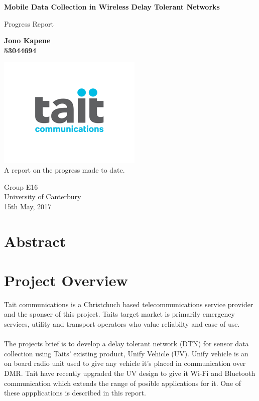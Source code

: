 \documentclass[a4paper,12pt]{article}
\begin{document}
	\begin{titlepage}
    		\begin{center}
        		\vspace*{1cm}
        
        		\textbf{Mobile Data Collection in Wireless Delay Tolerant Networks}
        
        		\vspace{0.5cm}
        		Progress Report
        
        		\vspace{1.5cm}
        
        		\textbf{Jono Kapene \\ 53044694}
        
        		\vfill
        		\includegraphics[scale=0.8]{Tait-Communications-logo.png}\\
        		A report on the progress made to date.
        		
        		\vspace{0.8cm}
        
        		Group E16\\
        		University of Canterbury\\
        		15th May, 2017
        
    \end{center}
\end{titlepage}
	\clearpage
	\tableofcontents
	\clearpage
	
	
\section{Abstract}
\clearpage

\section{Project Overview}
Tait communications is a Christchuch based telecommunications service provider and the sponser of this project. Taits target market is primarily emergency services, utility and transport operators who value reliabilty and ease of use.\\\\
The projects brief is to develop a delay tolerant network (DTN) for sensor data collection using Taits' existing product, Unify Vehicle (UV). Unify vehicle is an on board radio unit used to give any vehicle it's placed in communication over DMR. Tait have recently upgraded the UV design to give it Wi-Fi and Bluetooth communication which extends the range of posible applications for it. One of these appplications is described in this report. \\\\
\end{document}

